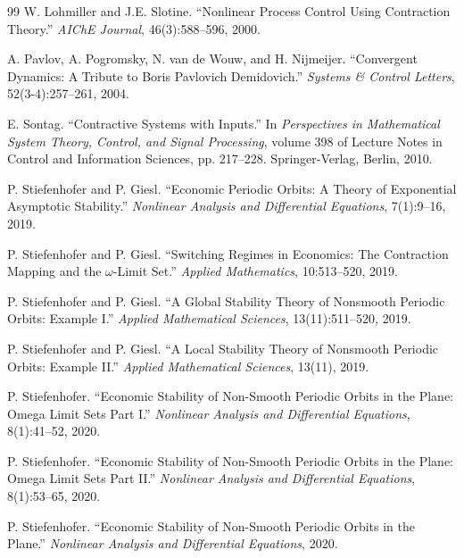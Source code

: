 \documentclass[11pt]{article}
\begin{document}
\begin{thebibliography}{99}
	W. Lohmiller and J.E. Slotine. “Nonlinear Process Control Using Contraction Theory.” \emph{AIChE Journal}, 46(3):588–596, 2000.
	
	A. Pavlov, A. Pogromsky, N. van de Wouw, and H. Nijmeijer. “Convergent Dynamics: A Tribute to Boris Pavlovich Demidovich.” \emph{Systems \& Control Letters}, 52(3-4):257–261, 2004.
	
	E. Sontag. “Contractive Systems with Inputs.” In \emph{Perspectives in Mathematical System Theory, Control, and Signal Processing}, volume 398 of Lecture Notes in Control and Information Sciences, pp. 217–228. Springer-Verlag, Berlin, 2010.
	
	P. Stiefenhofer and P. Giesl. “Economic Periodic Orbits: A Theory of Exponential Asymptotic Stability.” \emph{Nonlinear Analysis and Differential Equations}, 7(1):9–16, 2019.
	
	P. Stiefenhofer and P. Giesl. “Switching Regimes in Economics: The Contraction Mapping and the $\omega$-Limit Set.” \emph{Applied Mathematics}, 10:513–520, 2019.
	
		
		P. Stiefenhofer and P. Giesl. “A Global Stability Theory of Nonsmooth Periodic Orbits: Example I.” \emph{Applied Mathematical Sciences}, 13(11):511–520, 2019.
		
		P. Stiefenhofer and P. Giesl. “A Local Stability Theory of Nonsmooth Periodic Orbits: Example II.” \emph{Applied Mathematical Sciences}, 13(11), 2019.
		
		P. Stiefenhofer. “Economic Stability of Non-Smooth Periodic Orbits in the Plane: Omega Limit Sets Part I.” \emph{Nonlinear Analysis and Differential Equations}, 8(1):41–52, 2020.
		
		P. Stiefenhofer. “Economic Stability of Non-Smooth Periodic Orbits in the Plane: Omega Limit Sets Part II.” \emph{Nonlinear Analysis and Differential Equations}, 8(1):53–65, 2020.
		
		P. Stiefenhofer. “Economic Stability of Non-Smooth Periodic Orbits in the Plane.” \emph{Nonlinear Analysis and Differential Equations}, 2020.
		
	
	
\end{thebibliography}
\end{document}
